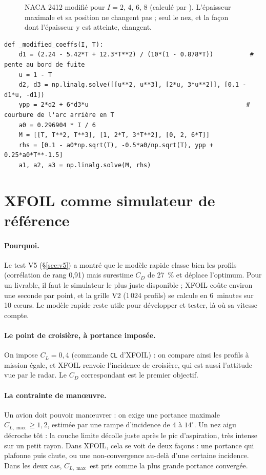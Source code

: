 \begin{figure}[htbp]
\centering

\caption{NACA 2412 modifié pour $I=2$, 4, 6, 8 (calculé par ). L'épaisseur maximale et sa position ne changent pas ; seul le nez, et la façon dont l'épaisseur y est atteinte, changent.}\label{fig:v2-formes}
\end{figure}

\begin{codebox}
\begin{lstlisting}
def _modified_coeffs(I, T):
    d1 = (2.24 - 5.42*T + 12.3*T**2) / (10*(1 - 0.878*T))          # pente au bord de fuite
    u = 1 - T
    d2, d3 = np.linalg.solve([[u**2, u**3], [2*u, 3*u**2]], [0.1 - d1*u, -d1])
    ypp = 2*d2 + 6*d3*u                                           # courbure de l'arc arrière en T
    a0 = 0.296904 * I / 6
    M = [[T, T**2, T**3], [1, 2*T, 3*T**2], [0, 2, 6*T]]
    rhs = [0.1 - a0*np.sqrt(T), -0.5*a0/np.sqrt(T), ypp + 0.25*a0*T**-1.5]
    a1, a2, a3 = np.linalg.solve(M, rhs)
\end{lstlisting}
\end{codebox}

\section{XFOIL comme simulateur de référence}
\paragraph{Pourquoi.} Le test V5 (§\ref{sec:v5}) a montré que le modèle rapide classe bien les profils (corrélation de rang 0,91) mais surestime $C_D$ de 27~\% et déplace l'optimum. Pour un livrable, il faut le simulateur le plus juste disponible ; XFOIL coûte environ une seconde par point, et la grille V2 (1\,024 profils) se calcule en 6~minutes sur 10 cœurs. Le modèle rapide reste utile pour développer et tester, là où sa vitesse compte.

\paragraph{Le point de croisière, à portance imposée.} On impose $C_L=0{,}4$ (commande \texttt{CL} d'XFOIL) : on compare ainsi les profils à mission égale, et XFOIL renvoie l'incidence de croisière, qui est aussi l'attitude vue par le radar. Le $C_D$ correspondant est le premier objectif.

\paragraph{La contrainte de manœuvre.} Un avion doit pouvoir manœuvrer : on exige une portance maximale $C_{L,\max}\ge1{,}2$, estimée par une rampe d'incidence de 4 à $14^\circ$. Un nez aigu décroche tôt : la couche limite décolle juste après le pic d'aspiration, très intense sur un petit rayon. Dans XFOIL, cela se voit de deux façons : une portance qui plafonne puis chute, ou une non-convergence au-delà d'une certaine incidence. Dans les deux cas, $C_{L,\max}$ est pris comme la plus grande portance convergée.

